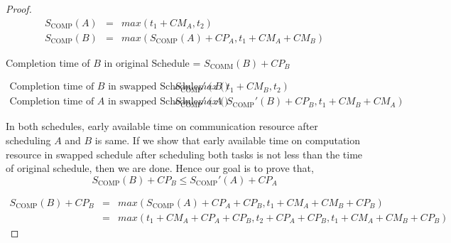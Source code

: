 \documentclass[sigconf]{acmart}
\newcommand{\scomm}{\ensuremath{{S}_{\text{COMM}}}}
\newcommand{\scomp}{\ensuremath{{S}_{\text{COMP}}}}
\begin{document}
\begin{proof}
		\begin{eqnarray*}
			\scomp(A) & = & max(t_1 + CM_A, t_2) \\
			\scomp(B) & = & max(\scomp(A) + CP_A,  t_1 + CM_A + CM_B)
		\end{eqnarray*}
		
		Completion time of $B$ in original Schedule = $\scomm(B) + CP_B$
		
		\begin{eqnarray*}
			\text{Completion time of $B$ in swapped Schedule, } \scomp '(B) & = & max(t_1 + CM_B, t_2)\\
			\text{Completion time of $A$ in swapped Schedule, } \scomp '(A) & = & max(\scomp'(B) + CP_B, t_1 + CM_B + CM_A)
		\end{eqnarray*}
		
		In both schedules, early available time on communication resource after scheduling $A$ and $B$ is same. If we show that early available time on computation resource in swapped schedule after scheduling both tasks is not less than the time of original schedule, then we are done. Hence our goal is to prove that,		
		$$\scomp(B) + CP_B \le \scomp'(A) + CP_A $$
		
		
		
		\begin{eqnarray*}
			\scomp(B) + CP_B & = & max(\scomp(A) + CP_A + CP_B,  t_1 + CM_A + CM_B + CP_B)\\
			& = & max(t_1 + CM_A + CP_A + CP_B, t_2 + CP_A + CP_B, t_1 + CM_A + CM_B + CP_B) 
		\end{eqnarray*}
		

\end{proof}
\end{document}
